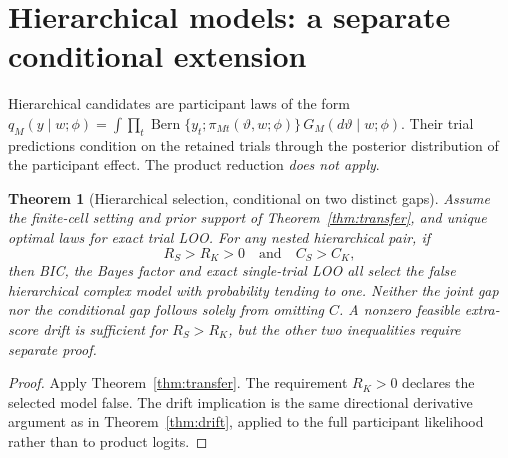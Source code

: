 \documentclass[11pt,letterpaper]{article}
\theoremstyle{plain}
\newtheorem{theorem}{Theorem}[section]
\theoremstyle{definition}
\newcommand{\Bern}{\operatorname{Bern}}
\begin{document}
\section{Hierarchical models: a separate conditional extension}
Hierarchical candidates are participant laws of the form $q_M(y\mid w;\phi)=\int\prod_t\Bern\{y_t;\pi_{Mt}(\vartheta,w;\phi)\}\,G_M(d\vartheta\mid w;\phi)$. Their trial predictions condition on the retained trials through the posterior distribution of the participant effect. The product reduction \emph{does not apply}.

\begin{theorem}[Hierarchical selection, conditional on two distinct gaps]\label{thm:hier}
Assume the finite-cell setting and prior support of Theorem~\ref{thm:transfer}, and unique optimal laws for exact trial LOO. For any nested hierarchical pair, if
\[
\boxed{\quad R_S>R_K>0\quad\text{and}\quad C_S>C_K,\quad}
\]
then BIC, the Bayes factor and exact single-trial LOO all select the false hierarchical complex model with probability tending to one. Neither the joint gap nor the conditional gap follows solely from omitting $C$. A nonzero feasible extra-score drift is sufficient for $R_S>R_K$, but the other two inequalities require separate proof.
\end{theorem}
\begin{proof}
Apply Theorem~\ref{thm:transfer}. The requirement $R_K>0$ declares the selected model false. The drift implication is the same directional derivative argument as in Theorem~\ref{thm:drift}, applied to the full participant likelihood rather than to product logits.
\end{proof}
\end{document}
